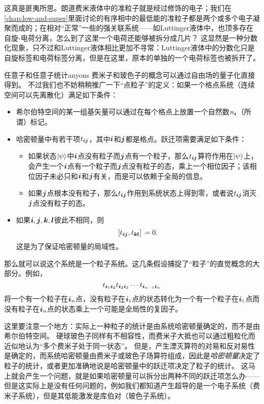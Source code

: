 这真是匪夷所思。朗道费米液体中的准粒子就是经过修饰的电子；我们在\autoref{chap:low-and-super}里面讨论的有序相中的最低能的准粒子都是两个或多个电子凝聚而成的；在相对“正常”一些的强关联系统——如Luttinger液体中，也顶多存在自旋-电荷分离，怎么到了这里一个电荷还能够被拆分成几片？
这显然是一种分数化现象，只不过和Luttinger液体相比更加不寻常：Luttinger液体中的分数化只是自旋标签和电荷标签分离，但是在这里，原本的单独的一个电荷标签也被拆开了。

\begin{back}{任意子和任意子统计}{anyons}
    费米子和玻色子的概念可以通过自由场的量子化直接得到。
    不过我们也不妨稍稍推广一下“点粒子”的定义：如果一个格点系统（连续空间可以先离散化）满足如下条件：
    \begin{itemize}
        \item 希尔伯特空间的某一组基矢量可以通过在每个格点上放置一个自然数$n_{\vb*{i}}$（所谓）标记。
        \item 哈密顿量中有若干项$t_{\vb*{i} \vb*{j}}$，其中$\vb*{i}$和$\vb*{j}$都是格点。跃迁项需要满足如下条件：
        \begin{itemize}
            \item 如果状态$\ket{\psi}$中$\vb*{i}$点没有粒子而$\vb*{j}$点有一个粒子，那么$t_{\vb*{i} \vb*{j}}$算符作用在$\ket{\psi}$上，会产生一个$\vb*{i}$点有一个粒子而$\vb*{j}$点没有粒子的态，乘上一个相位因子；该相位因子未必只和$\vb*{i}$和$\vb*{j}$有关，而是可以依赖于全局的信息。
            \item 如果$\vb*{j}$点根本没有粒子，那么$t_{\vb*{i} \vb*{j}}$作用到系统状态上得到零，或者说$t_{\vb*{i} \vb*{j}}$消灭$\vb*{j}$点没有粒子的态。
        \end{itemize}
        \item 如果$\vb*{i}, \vb*{j}, \vb*{k}, \vb*{l}$彼此不相同，则
        \begin{equation}
            \comm*{t_{\vb*{i} \vb*{j}}}{t_{\vb*{k} \vb*{l}}} = 0.
        \end{equation}
        这是为了保证哈密顿量的局域性。
    \end{itemize}
    那么就可以说这个系统是一个粒子系统。这几条假设捕捉了“粒子”的直觉概念的大部分。例如，
    \[
        t_{\vb*{i}_1 \vb*{i}_2} t_{\vb*{i}_2 \vb*{i}_3} \cdots t_{\vb*{i}_{n-1} \vb*{i}_n} 
    \]
    将一个有一个粒子在$\vb*{i}_n$点，没有粒子在$\vb*{i}_1$点的状态转化为一个有一个粒子在$\vb*{i}_1$点而没有粒子在$\vb*{i}_n$点的状态乘上一个可能是全局性的复因子。

    这里要注意一个地方：实际上一种粒子的统计是由系统哈密顿量确定的，而不是由希尔伯特空间。
    硬球玻色子同样有不相容性，而费米子大抵也可以通过粗粒化而近似地认为“多个费米子处于同一状态”。
    但是，产生湮灭算符的对易和反对易性是确定的，而系统哈密顿量由费米子或玻色子场算符组成，因此是\emph{哈密顿量}决定了粒子的统计，或者更加准确地说是哈密顿量中的跃迁项决定了粒子的统计。
    这马上就会产生一个问题，就是如果哈密顿量可以拆分出两种不同的跃迁项怎么办——但是这实际上是没有任何问题的，例如我们都知道产生超导的是一个电子系统（费米子系统），但是其低能激发是库伯对（玻色子系统）。
    

\end{back}
